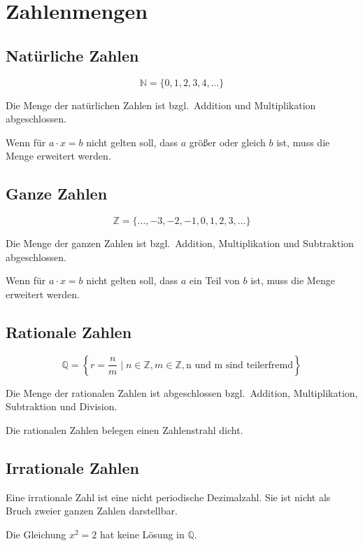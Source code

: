 \section{Zahlenmengen}

\subsection{Natürliche Zahlen}

\[
	\mathbb{N} = \{ 0, 1, 2, 3, 4, \ldots \}
\]

Die Menge der natürlichen Zahlen ist bzgl.\ Addition und Multiplikation abgeschlossen.

Wenn für \( a \cdot x = b \) nicht gelten soll, dass \( a \) größer oder gleich \( b \) ist, muss die Menge erweitert werden.

\subsection{Ganze Zahlen}

\[
	\mathbb{Z} = \{ \ldots, -3, -2, -1, 0, 1, 2, 3, \ldots \}
\]

Die Menge der ganzen Zahlen ist bzgl.\ Addition, Multiplikation und Subtraktion abgeschlossen.

Wenn für \( a \cdot x = b \) nicht gelten soll, dass \( a \) ein Teil von \( b \) ist, muss die Menge erweitert werden.

\subsection{Rationale Zahlen}

\[
	\mathbb{Q} = \left \{ r = \frac{n}{m} \mid n \in \mathbb{Z}, m \in \mathbb{Z},
	\text{n und m sind teilerfremd} \right \}
\]

Die Menge der rationalen Zahlen ist abgeschlossen bzgl.\ Addition, Multiplikation, Subtraktion und Division.

Die rationalen Zahlen belegen einen Zahlenstrahl dicht.

\subsection{Irrationale Zahlen}

Eine irrationale Zahl ist eine nicht periodische Dezimalzahl.
Sie ist nicht als Bruch zweier ganzen Zahlen darstellbar.

Die Gleichung \( x^2 = 2 \) hat keine Lösung in \( \mathbb{Q} \).


